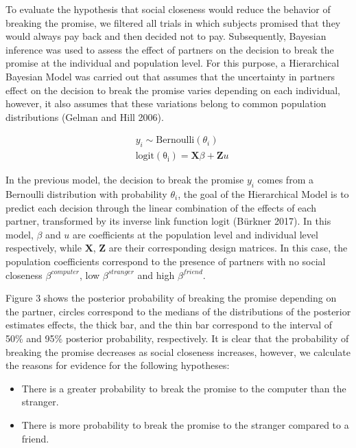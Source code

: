 \documentclass[smallextended]{svjour3}       %
\begin{document}
To evaluate the hypothesis that social closeness would reduce the
behavior of breaking the promise, we filtered all trials in which
subjects promised that they would always pay back and then decided not
to pay. Subsequently, Bayesian inference was used to assess the effect
of partners on the decision to break the promise at the individual and
population level. For this purpose, a Hierarchical Bayesian Model was
carried out that assumes that the uncertainty in partners effect on the
decision to break the promise varies depending on each individual,
however, it also assumes that these variations belong to common
population distributions (Gelman and Hill 2006).

\[
\begin{aligned}
&y_i \sim \mathrm{Bernoulli}(\theta_i) \\
&\mathrm{logit(\theta_i)} = \mathbf{X}\beta  +  \mathbf{Z}u
\end{aligned}
\]

In the previous model, the decision to break the promise \(y_i\) comes
from a Bernoulli distribution with probability \(\theta_i\), the goal of
the Hierarchical Model is to predict each decision through the linear
combination of the effects of each partner, transformed by its inverse
link function \(\mathrm{logit}\) (Bürkner 2017). In this model,
\(\beta\) and \(u\) are coefficients at the population level and
individual level respectively, while \(\mathbf{X}\), \(\mathbf{Z}\) are
their corresponding design matrices. In this case, the population
coefficients correspond to the presence of partners with no social
closeness \(\beta^{computer}\), low \(\beta^{stranger}\) and high
\(\beta^{friend}\).

Figure 3 shows the posterior probability of breaking the promise
depending on the partner, circles correspond to the medians of the
distributions of the posterior estimates effects, the thick bar, and the
thin bar correspond to the interval of 50\% and 95\% posterior
probability, respectively. It is clear that the probability of breaking
the promise decreases as social closeness increases, however, we
calculate the reasons for evidence for the following hypotheses:

\begin{itemize}
\item
  There is a greater probability to break the promise to the computer
  than the stranger.
\item
  There is more probability to break the promise to the stranger
  compared to a friend.
\end{itemize}
\end{document}
